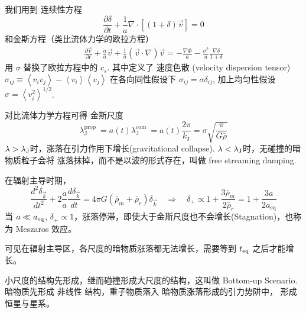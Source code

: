 \documentclass[12pt]{ctexart}
\begin{document}
我们用到
连续性方程
\begin{equation}
    \frac{\partial \delta}{\partial t}+\frac{1}{a} \nabla \cdot[(1+\delta) \vec{v}]=0
\end{equation}
和金斯方程（类比流体力学的欧拉方程）
\begin{eqnarray}
    \frac{\partial \vec{v}}{\partial t}+\frac{\dot{a}}{a} \vec{v}+\frac{1}{a}(\vec{v} \cdot \nabla) \vec{v} =-\frac{\nabla \Phi}{a} - \frac{\sigma^2}{a}\frac{\nabla \delta}{1+\delta}
\end{eqnarray}
用 $\sigma$ 替换了欧拉方程中的 $c_s$.
其中定义了 速度色散 (velocity dispersion tensor)
$\sigma_{ij} \equiv\left\langle v_{i} v_{j}\right\rangle-\left\langle v_{i}\right\rangle\left\langle v_{j}\right\rangle$
在各向同性假设下 $\sigma_{ij}=\sigma\delta_{ij}$,
加上均匀性假设 $\sigma=\left\langle v_i^2 \right\rangle ^{1/2}$.

对比流体力学方程可得 金斯尺度 
\begin{equation}
    \lambda_{\mathrm{J}}^{\text {prop }}=a(t) \lambda_{\mathrm{J}}^{\text {com }}=a(t) \frac{2 \pi}{k_{\mathrm{J}}}=\sigma \sqrt{\frac{\pi}{G \bar{\rho}}}
\end{equation}
$\lambda > \lambda_{\rm{J}}$时，涨落在引力作用下增长(gravitational collapse).
$\lambda < \lambda_{\rm{J}}$时，无碰撞的暗物质粒子会将 涨落抹掉，而不是以波的形式存在，叫做 free streaming damping.


在辐射主导时期，
\begin{equation}
    \frac{d^{2} \delta_{\vec{k}} }{d t^{2}}+2 \frac{\dot{a}}{a} \frac{d \delta_{\vec{k}}}{d t}=4 \pi G\left(\bar{\rho}_{m}+\bar{\rho}_{r}\right) \delta_{\vec{k}} \quad \Rightarrow \quad \delta_{+} \propto 1+\frac{3 \bar{\rho}_{m}}{2 \bar{\rho}_{r}}=1+\frac{3 a}{2 a_{\mathrm{eq}}} 
\end{equation}
当 $a\ll a_{\rm{eq}}$, $\delta_{+}\propto 1$，涨落停滞，即使大于金斯尺度也不会增长(Stagnation)，也称为 Meszaros 效应。

可见在辐射主导区，各尺度的暗物质涨落都无法增长，需要等到 $t_{\rm{eq}}$ 之后才能增长。

小尺度的结构先形成，继而碰撞形成大尺度的结构，这叫做 Bottom-up Scenario.
暗物质先形成 非线性 结构，重子物质落入 暗物质涨落形成的引力势阱中，
形成恒星与星系。
\end{document}
